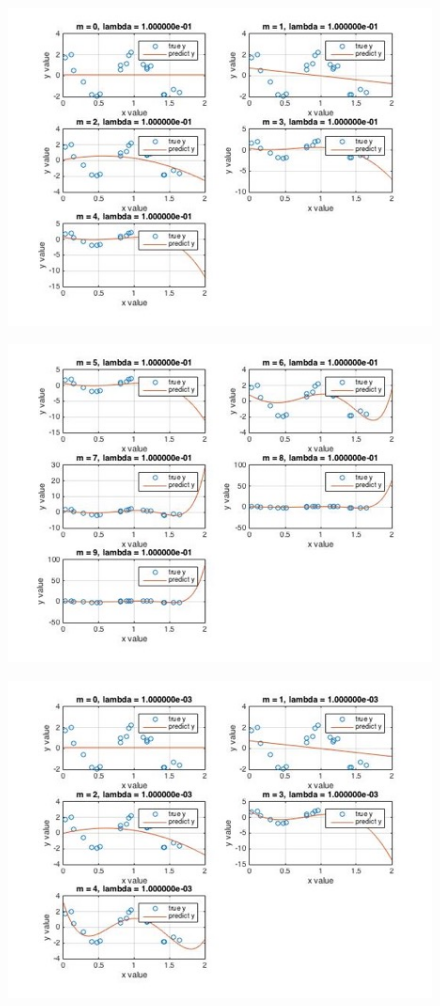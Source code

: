 \documentclass[]{article}
\begin{document}
	\begin{figure}[H]
		\centering
		\includegraphics[width=0.8\linewidth]{2e1}
		\caption{}
		\label{fig:2e1}
	\end{figure}
	\begin{figure}[H]
		\centering
		\includegraphics[width=0.8\linewidth]{2e2}
		\caption{}
		\label{fig:2e2}
	\end{figure}
	\begin{figure}[H]
		\centering
		\includegraphics[width=0.8\linewidth]{2e3}
		\caption{}
		\label{fig:2e3}
	\end{figure}
\end{document}
